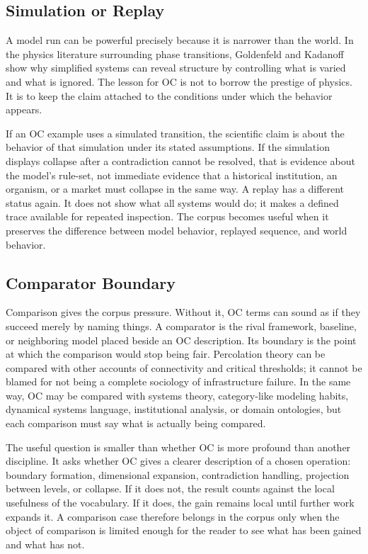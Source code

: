 \documentclass[11pt,a4paper,openany]{book}
\begin{document}
\subsection{Simulation or Replay}
A model run can be powerful precisely because it is narrower than the world. In the physics literature surrounding phase transitions, Goldenfeld and Kadanoff show why simplified systems can reveal structure by controlling what is varied and what is ignored. The lesson for OC is not to borrow the prestige of physics. It is to keep the claim attached to the conditions under which the behavior appears. \cite{stauffer_percolation,grimmett_percolation}\par
If an OC example uses a simulated transition, the scientific claim is about the behavior of that simulation under its stated assumptions. If the simulation displays collapse after a contradiction cannot be resolved, that is evidence about the model's rule-set, not immediate evidence that a historical institution, an organism, or a market must collapse in the same way. A replay has a different status again. It does not show what all systems would do; it makes a defined trace available for repeated inspection. The corpus becomes useful when it preserves the difference between model behavior, replayed sequence, and world behavior.\par
\subsection{Comparator Boundary}
Comparison gives the corpus pressure. Without it, OC terms can sound as if they succeed merely by naming things. A comparator is the rival framework, baseline, or neighboring model placed beside an OC description. Its boundary is the point at which the comparison would stop being fair. Percolation theory can be compared with other accounts of connectivity and critical thresholds; it cannot be blamed for not being a complete sociology of infrastructure failure. In the same way, OC may be compared with systems theory, category-like modeling habits, dynamical systems language, institutional analysis, or domain ontologies, but each comparison must say what is actually being compared. \cite{stauffer_percolation,grimmett_percolation}\par
The useful question is smaller than whether OC is more profound than another discipline. It asks whether OC gives a clearer description of a chosen operation: boundary formation, dimensional expansion, contradiction handling, projection between levels, or collapse. If it does not, the result counts against the local usefulness of the vocabulary. If it does, the gain remains local until further work expands it. A comparison case therefore belongs in the corpus only when the object of comparison is limited enough for the reader to see what has been gained and what has not.\par
\end{document}
